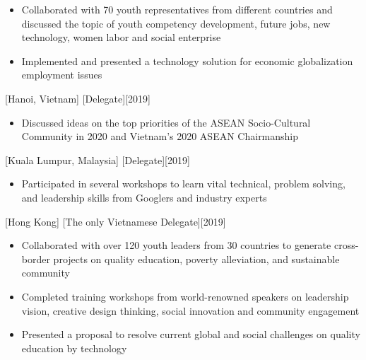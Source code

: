 \documentclass{article}
\begin{document}
\begin{itemize}
\item Collaborated with 70 youth representatives from different countries and discussed the topic of youth
competency development, future jobs, new technology, women labor and social enterprise
\item Implemented and presented a technology solution for economic globalization employment issues
\end{itemize}

[Hanoi, Vietnam]
[Delegate][2019]

\begin{itemize}
\item Discussed ideas on the top priorities of the ASEAN Socio-Cultural Community in 2020 and Vietnam’s
2020 ASEAN Chairmanship
\end{itemize}

[Kuala Lumpur, Malaysia]
[Delegate][2019]

\begin{itemize}
\item Participated in several workshops to learn vital technical, problem solving, and leadership skills from
Googlers and industry experts
\end{itemize}

[Hong Kong]
[The only Vietnamese Delegate][2019]

\begin{itemize}
\item Collaborated with over 120 youth leaders from 30 countries to generate cross-border projects on
quality education, poverty alleviation, and sustainable community
\item Completed training workshops from world-renowned speakers on leadership vision, creative design
thinking, social innovation and community engagement
\item Presented a proposal to resolve current global and social challenges on quality education by technology
\end{itemize}
\end{document}
